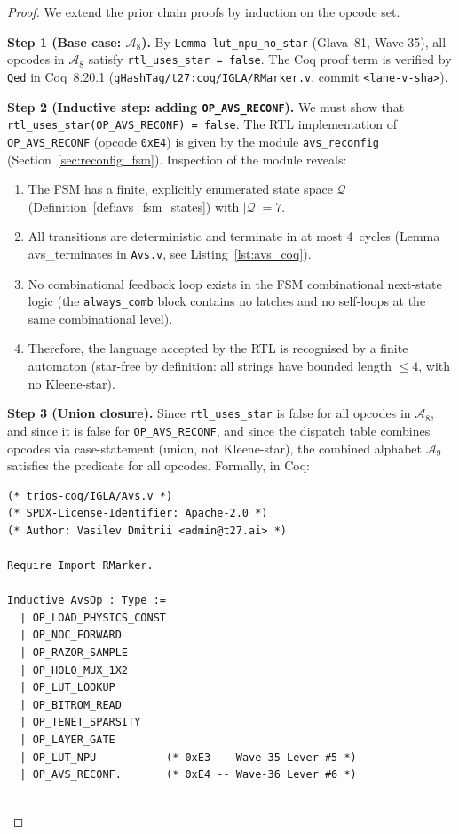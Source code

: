 \begin{proof}
We extend the prior chain proofs by induction on the opcode set.

\medskip
\noindent\textbf{Step 1 (Base case: $\mathcal{A}_8$).}
By \texttt{Lemma lut\_npu\_no\_star} (Glava~81, Wave-35), all opcodes
in $\mathcal{A}_8$ satisfy \texttt{rtl\_uses\_star = false}.  The
Coq proof term is verified by \texttt{Qed} in Coq~8.20.1
(\texttt{gHashTag/t27:coq/IGLA/RMarker.v},
commit \texttt{<lane-v-sha>}).

\medskip
\noindent\textbf{Step 2 (Inductive step: adding \texttt{OP\_AVS\_RECONF}).}
We must show that \texttt{rtl\_uses\_star(OP\_AVS\_RECONF) = false}.
The RTL implementation of \texttt{OP\_AVS\_RECONF} (opcode \texttt{0xE4})
is given by the module \texttt{avs\_reconfig} (Section~\ref{sec:reconfig_fsm}).
Inspection of the module reveals:
\begin{enumerate}
  \item The FSM has a finite, explicitly enumerated state space
    $\mathcal{Q}$ (Definition~\ref{def:avs_fsm_states}) with $|\mathcal{Q}| = 7$.
  \item All transitions are deterministic and terminate in at most
    4~cycles (Lemma avs\_terminates in \texttt{Avs.v}, see
    Listing~\ref{lst:avs_coq}).
  \item No combinational feedback loop exists in the FSM combinational
    next-state logic (the \texttt{always\_comb} block contains no
    latches and no self-loops at the same combinational level).
  \item Therefore, the language accepted by the RTL is recognised by
    a finite automaton (star-free by definition: all strings have
    bounded length $\leq 4$, with no Kleene-star).
\end{enumerate}

\medskip
\noindent\textbf{Step 3 (Union closure).}
Since \texttt{rtl\_uses\_star} is false for all opcodes in $\mathcal{A}_8$,
and since it is false for \texttt{OP\_AVS\_RECONF}, and since the
dispatch table combines opcodes via case-statement (union, not
Kleene-star), the combined alphabet $\mathcal{A}_9$ satisfies the
predicate for all opcodes.  Formally, in Coq:
\begin{lstlisting}[language=Coq, caption={Coq theorem avs\_safe}, label={lst:avs_coq}]
(* trios-coq/IGLA/Avs.v *)
(* SPDX-License-Identifier: Apache-2.0 *)
(* Author: Vasilev Dmitrii <admin@t27.ai> *)

Require Import RMarker.

Inductive AvsOp : Type :=
  | OP_LOAD_PHYSICS_CONST
  | OP_NOC_FORWARD
  | OP_RAZOR_SAMPLE
  | OP_HOLO_MUX_1X2
  | OP_LUT_LOOKUP
  | OP_BITROM_READ
  | OP_TENET_SPARSITY
  | OP_LAYER_GATE
  | OP_LUT_NPU           (* 0xE3 -- Wave-35 Lever #5 *)
  | OP_AVS_RECONF.       (* 0xE4 -- Wave-36 Lever #6 *)


\end{lstlisting}
\end{proof}
